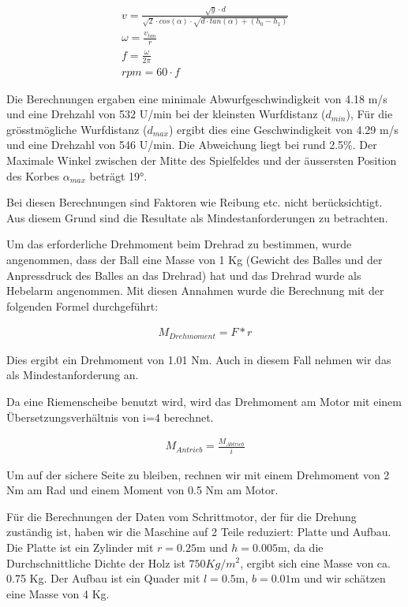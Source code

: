 \begin{gather}
	v=\frac{\sqrt{g} \cdot d}{\sqrt{2} \cdot cos(\alpha) \cdot \sqrt{d \cdot tan(\alpha)+(h_0-h_1)}}\\
	\omega=\frac{v_{tan}}{r}\\
	f=\frac{\omega}{2\pi}\\
	rpm=60 \cdot f
\end{gather}

Die Berechnungen ergaben eine minimale Abwurfgeschwindigkeit von 4.18 m/s und eine Drehzahl von 532 U/min bei der kleinsten Wurfdistanz ($d_{min}$), 
Für die grösstmögliche Wurfdistanz ($d_{max}$) ergibt dies eine Geschwindigkeit von 4.29 m/s und eine Drehzahl von 546 U/min. 
Die Abweichung liegt bei rund 2.5\%.
Der Maximale Winkel zwischen der Mitte des Spielfeldes und der äussersten Position des Korbes $\alpha_{max}$ beträgt 19°.

Bei diesen Berechnungen sind Faktoren wie Reibung etc. nicht berücksichtigt. Aus diesem Grund sind die Resultate als Mindestanforderungen zu betrachten.

Um das erforderliche Drehmoment beim Drehrad zu bestimmen, wurde angenommen, dass der Ball eine Masse von 1 Kg (Gewicht des Balles und der Anpressdruck des Balles an das Drehrad) hat und das Drehrad wurde als Hebelarm angenommen. Mit diesen Annahmen wurde die Berechnung mit der folgenden Formel durchgeführt:

\begin{gather}
	M_{Drehmoment}=F*r
\end{gather}

Dies ergibt ein Drehmoment von 1.01 Nm. Auch in diesem Fall nehmen wir das als Mindestanforderung an.

Da eine Riemenscheibe benutzt wird, wird das Drehmoment am Motor mit einem Übersetzungsverhältnis von i=4 berechnet.

\begin{gather}
	M_{Antrieb}=\frac{M_{Abtrieb}}{i}
\end{gather}

Um auf der sichere Seite zu bleiben, rechnen wir mit einem Drehmoment von 2 Nm am Rad und einem Moment von 0.5 Nm am Motor.

Für die Berechnungen der Daten vom Schrittmotor, der für die Drehung zuständig ist, haben wir die Maschine auf 2 Teile reduziert: Platte und Aufbau.
Die Platte ist ein Zylinder mit $r=0.25$m und $h=0.005$m, da die Durchschnittliche Dichte der Holz ist $750 Kg/m^2$, ergibt sich eine Masse von ca. 0.75 Kg.
Der Aufbau ist ein Quader mit $l=0.5$m, $b=0.01$m und wir schätzen eine Masse von 4 Kg.

